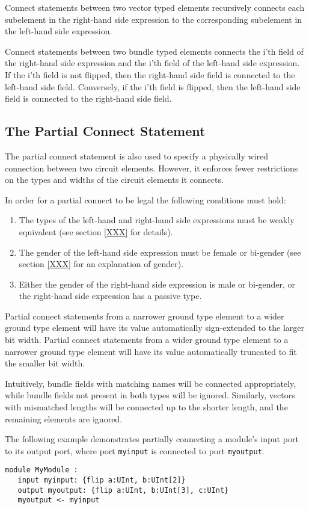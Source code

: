 \documentclass[12pt]{article}
\begin{document}
Connect statements between two vector typed elements recursively connects each subelement in the right-hand side expression to the corresponding subelement in the left-hand side expression. 

Connect statements between two bundle typed elements connects the i'th field of the right-hand side expression and the i'th field of the left-hand side expression. If the i'th field is not flipped, then the right-hand side field is connected to the left-hand side field. Conversely, if the i'th field is flipped, then the left-hand side field is connected to the right-hand side field.


\subsection{The Partial Connect Statement}
The partial connect statement is also used to specify a physically wired connection between two circuit elements. However, it enforces fewer restrictions on the types and widths of the circuit elements it connects. 

In order for a partial connect to be legal the following conditions must hold:
\begin{enumerate}
\item The types of the left-hand and right-hand side expressions must be weakly equivalent (see section \ref{XXX} for details).
\item The gender of the left-hand side expression must be female or bi-gender (see section \ref{XXX} for an explanation of gender).
\item Either the gender of the right-hand side expression is male or bi-gender, or the right-hand side expression has a passive type.
\end{enumerate}

Partial connect statements from a narrower ground type element to a wider ground type element will have its value automatically sign-extended to the larger bit width. Partial connect statements from a wider ground type element to a narrower ground type element will have its value automatically truncated to fit the smaller bit width. 

Intuitively, bundle fields with matching names will be connected appropriately, while bundle fields not present in both types will be ignored. Similarly, vectors with mismatched lengths will be connected up to the shorter length, and the remaining elements are ignored.

The following example demonstrates partially connecting a module's input port to its output port, where port \verb|myinput| is connected to port \verb|myoutput|.
\begin{verbatim}
module MyModule :
   input myinput: {flip a:UInt, b:UInt[2]}
   output myoutput: {flip a:UInt, b:UInt[3], c:UInt}
   myoutput <- myinput
\end{verbatim}
\end{document}
